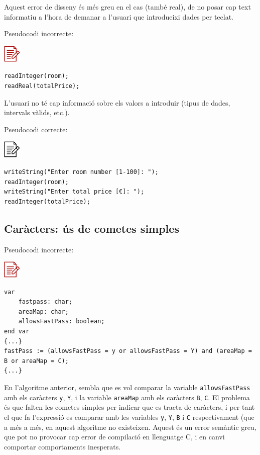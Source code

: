 \documentclass[
]{book}
\begin{document}
Aquest error de disseny és més greu en el cas (també real), de no posar cap text informatiu a l'hora de demanar a l'usuari que introdueixi dades per teclat.

Pseudocodi incorrecte:

\includegraphics{./img/alg_err.png}

\begin{verbatim}
readInteger(room);
readReal(totalPrice);
\end{verbatim}

L'usuari no té cap informació sobre els valors a introduir (tipus de dades, intervals vàlids, etc.).

Pseudocodi correcte:

\includegraphics{./img/alg.png}

\begin{verbatim}
writeString("Enter room number [1-100]: ");
readInteger(room);
writeString("Enter total price [€]: ");
readInteger(totalPrice);
\end{verbatim}

\hypertarget{caruxe0cters-uxfas-de-cometes-simples}{%
\subsection{Caràcters: ús de cometes simples}\label{caruxe0cters-uxfas-de-cometes-simples}}

Pseudocodi incorrecte:

\includegraphics{./img/alg_err.png}

\begin{verbatim}
var
    fastpass: char;
    areaMap: char;
    allowsFastPass: boolean;
end var
{...}
fastPass := (allowsFastPass = y or allowsFastPass = Y) and (areaMap = B or areaMap = C);
{...}
\end{verbatim}

En l'algoritme anterior, sembla que es vol comparar la variable \texttt{allowsFastPass} amb els caràcters \texttt{y}, \texttt{Y}, i la variable \texttt{areaMap} amb els caràcters \texttt{B}, \texttt{C}. El problema és que falten les cometes simples per indicar que es tracta de caràcters, i per tant el que fa l'expressió es comparar amb les variables \texttt{y}, \texttt{Y}, \texttt{B} i \texttt{C} respectivament (que a més a més, en aquest algoritme no existeixen. Aquest és un error semàntic greu, que pot no provocar cap error de compilació en llenguatge C, i en canvi comportar comportaments inesperats.
\end{document}

